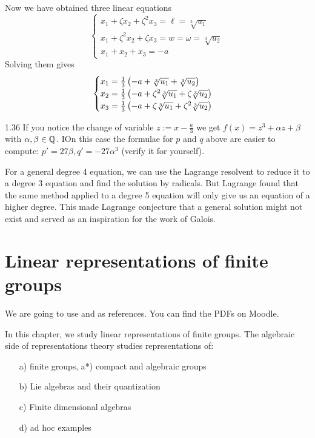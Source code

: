 \documentclass[twoside = false,	%
		headsepline,		%
		parskip = true,
		]{scrbook}						%
\begin{document}
            Now we have obtained three linear equations
            $$
            \begin{cases}
            x_1+\zeta x_2+\zeta^2x_3=\ell=\sqrt[3]{u_1}\\
            x_1+\zeta^2x_2+\zeta x_3=w=\omega=\sqrt[3]{u_2}\\
            x_1+x_2+x_3=-a
            \end{cases}
            $$
            Solving them gives 
            $$
            \begin{cases}
            x_1=\frac13\left( -a+\sqrt[3]{u_1}+\sqrt[3]{u_2}\right)\\
            x_2=\frac13\left( -a+\zeta^2\sqrt[3]{u_1}+\zeta\sqrt[3]{u_2}\right)\\
            x_3=\frac13\left( -a+\zeta\sqrt[3]{u_1}+\zeta^2\sqrt[3]{u_2}\right)
            \end{cases}
            $$
            \begin{remark}{}{1.36}
                If you notice the change of variable $z:=x-\frac a3$ we get $f(x)=z^3+\alpha z+\beta$ with $\alpha,\beta \in\mathbb Q$. IOn this case the formulae for $p$ and $q$ above are easier to compute: $p'=27\beta, q'=-27\alpha^3$ (verify it for yourself).
            \end{remark}
            For a general degree 4 equation, we can use the Lagrange resolvent to reduce it to a degree 3 equation and find the solution by radicals. But Lagrange found that the same method applied to a degree 5 equation will only give us an equation of a higher degree. This made Lagrange conjecture that a general solution might not exist and served as an inspiration for the work of Galois.
            
            
\chapter{Linear representations of finite groups}
    We are going to use \cite{Serre.1977} and \cite{FultonHarris.1991} as references. You can find the PDFs on Moodle.
    
    In this chapter, we study linear representations of finite groups. The algebraic side of representations theory studies representations of:
    
    \begin{enumerate}
        \item[a)] finite groups, a*) compact and algebraic groups
        \item[b)] Lie algebras and their quantization
        \item[c)] Finite dimensional algebras
        \item[d)] ad hoc examples
    \end{enumerate}
    
\end{document}
